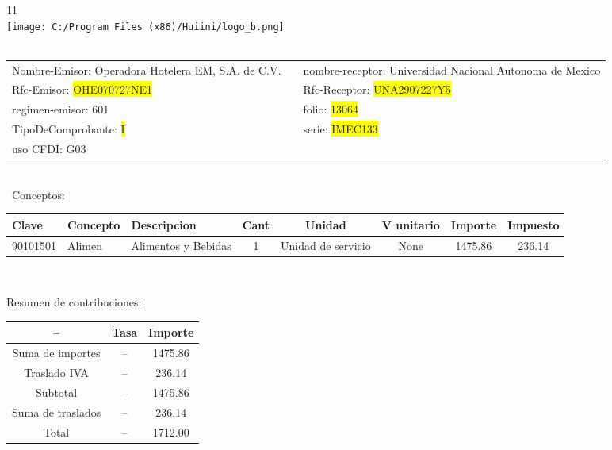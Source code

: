 \documentclass{article}
\begin{document}
\hspace{18cm} 11\\
\texttt{[image: C:/Program Files (x86)/Huiini/logo\_b.png]}
\bigskip\\\
\begin{tabular}{p{11cm}p{1cm}p{8cm}}

Nombre-Emisor: Operadora Hotelera EM, S.A. de C.V. && nombre-receptor: Universidad Nacional Autonoma de Mexico\\

Rfc-Emisor: \colorbox{yellow}{ OHE070727NE1 } & & Rfc-Receptor: \colorbox{yellow}{ UNA2907227Y5 }\\

regimen-emisor: 601 & & folio: \colorbox{yellow}{ 13064 }\\

TipoDeComprobante: \colorbox{yellow}{ I } & & serie: \colorbox{yellow}{ IMEC133 }\\

uso CFDI: G03\\



\end{tabular}
\bigskip\bigskip\bigskip\\\
Conceptos:\\
\begin{tabular}{|p{1.5cm}|p{3.6cm}|p{3.6cm}|c|c|c|c|c|}
\hline
Clave & Concepto & Descripcion & Cant & Unidad & V unitario & Importe & Impuesto \\
\hline

90101501 & Alimen & Alimentos y Bebidas & 1 & Unidad de servicio & None & 1475.86 &  236.14 \\
\hline

\end{tabular}\\
\bigskip
\begin{center}
Resumen de contribuciones:\\
\bigskip
\begin{tabular}{|c|c|c|}
\hline
 -- & Tasa & Importe\\
\hline

Suma de importes & -- & 1475.86 \\
\hline

Traslado IVA & -- & 236.14 \\
\hline

Subtotal  & -- & 1475.86 \\
\hline

Suma de traslados & -- & 236.14 \\
\hline

Total  & -- & 1712.00 \\
\hline

\end{tabular}
\end{center}
\end{document}
